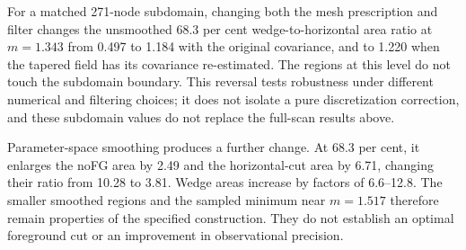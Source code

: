 For a matched 271-node subdomain, changing both the mesh prescription and filter changes the unsmoothed 68.3 per cent wedge-to-horizontal area ratio at $m=1.343$ from 0.497 to 1.184 with the original covariance, and to 1.220 when the tapered field has its covariance re-estimated. The regions at this level do not touch the subdomain boundary. This reversal tests robustness under different numerical and filtering choices; it does not isolate a pure discretization correction, and these subdomain values do not replace the full-scan results above.

Parameter-space smoothing produces a further change. At 68.3 per cent, it enlarges the noFG area by 2.49 and the horizontal-cut area by 6.71, changing their ratio from 10.28 to 3.81. Wedge areas increase by factors of 6.6--12.8. The smaller smoothed regions and the sampled minimum near $m=1.517$ therefore remain properties of the specified construction. They do not establish an optimal foreground cut or an improvement in observational precision.
